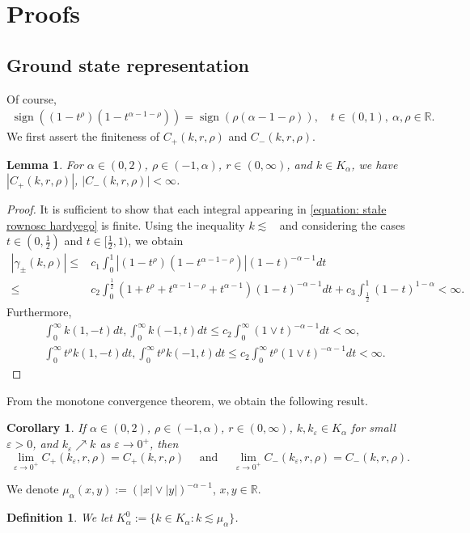 \documentclass[12pt, a4paper]{amsart}
\newtheorem{lemma}[theorem]{Lemma}
\newtheorem{definition}[theorem]{Definition}
\newtheorem{corollary}[theorem]{Corollary}
\DeclareMathOperator{\sign}{sign}
\DeclareMathOperator{\Mass}{\nu_{\alpha}}
\newcommand*{\as}{\textcolor{blue}}
\newcommand{\R}{\mathbb{R}}
\begin{document}
\section{Proofs}
\label{sec: proofs}
\subsection{Ground state representation}
Of course,
\begin{align*}
\sign((1 - t^\rho)(1 - t^{\alpha - 1- \rho})) = \sign(\rho(\alpha - 1- \rho)), \quad t \in (0, 1), \ \alpha, \rho \in \R.
\end{align*}
We first assert the finiteness of $C_{+}(k, r, \rho)$ and $C_{-}(k, r, \rho)$.
\begin{lemma}
For $\alpha \in (0, 2)$, $\rho \in (-1, \alpha)$, $r \in (0, \infty)$, and $k \in K_\alpha$, we have $|C_{+}(k, r, \rho)|$, $|C_{-}(k, r, \rho)| < \infty$.
\end{lemma}

\begin{proof}
It is sufficient to show that each integral appearing in \cref{equation: stałe rownosc hardyego} is finite. Using the inequality $k \lesssim \Mass$ and considering the cases $t \in (0, \frac{1}{2})$ and $t \in [\frac{1}{2}, 1)$, we obtain
\begin{align*}
    |\gamma_{\pm}(k, \rho)| \leq & c_1\int_{0}^{1}|(1 - t^\rho)(1 - t^{\alpha - 1- \rho})|(1 - t)^{-\alpha - 1}dt 
    \\
    \leq & c_2\int_{0}^{\frac{1}{2}}(1 + t^\rho + t^{\alpha - 1- \rho} + t^{\alpha - 1})(1 - t)^{-\alpha - 1}dt + c_3\int_{\frac{1}{2}}^{1}(1 - t)^{1-\alpha} < \infty.
\end{align*}
Furthermore,
\begin{align*}
    &\int_{0}^{\infty}k(1, -t)dt, \int_{0}^{\infty}k(-1, t)dt \leq c_2\int_0^{\infty}(1 \lor t)^{-\alpha -1}dt < \infty,
    \\
    &\int_{0}^{\infty}t^\rho k(1, -t)dt, \int_{0}^{\infty}t^\rho k(-1, t)dt \leq c_2\int_0^{\infty}t^\rho(1 \lor t)^{-\alpha -1}dt < \infty.
\end{align*}
\end{proof}
From 
the monotone convergence theorem, we obtain the following result.
\begin{corollary}
\label{collary: zbieznosc stalych}
If $\alpha \in (0, 2)$, $\rho \in (-1, \alpha)$, $r \in (0, \infty)$, $k, k_\varepsilon \in K_\alpha$ for small $\varepsilon > 0$, and $k_\varepsilon \nearrow k$ as $\varepsilon \rightarrow 0^+$, then
\[
\lim_{\varepsilon \rightarrow 0^+}C_{+}(k_\varepsilon, r, \rho) = C_{+}(k, r, \rho) \quad\mbox{ and } \quad 
\lim_{\varepsilon \rightarrow 0^+}C_{-}(k_\varepsilon, r, \rho) = C_{-}(k, r, \rho).
\]
\end{corollary}
We denote
    $\mu_\alpha(x, y) := (|x| \lor |y|)^{-\alpha-1}$, $x,y\in \mathbb R$.
\begin{definition} We let
    $K_\alpha^0 := \{ k \in K_\alpha : k \lesssim \mu_\alpha\}$.
\end{definition}
\end{document}
